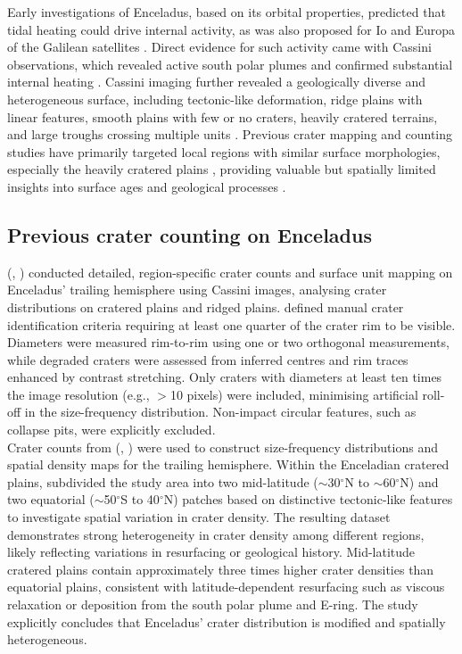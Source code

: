 \documentclass[preprint,11pt,3p,times,authoryear]{elsarticle}
\begin{document}
Early investigations of Enceladus, based on its orbital properties, predicted that tidal heating could drive internal activity, as was also proposed for Io and Europa of the Galilean satellites \citep{Cassen1979, Peale1979}. Direct evidence for such activity came with Cassini observations, which revealed active south polar plumes and confirmed substantial internal heating \citep{Porco2006, Spencer2006}. Cassini imaging further revealed a geologically diverse and heterogeneous surface, including tectonic-like deformation, ridge plains with linear features, smooth plains with few or no craters, heavily cratered terrains, and large troughs crossing multiple units \citep{Helfenstein2010}. Previous crater mapping and counting studies have primarily targeted local regions with similar surface morphologies, especially the heavily cratered plains \citep{Kirchoff2009, Kinczyk2024, Blanco-Rojas2024}, providing valuable but spatially limited insights into surface ages and geological processes \citep{Kirchoff2010, Bland2012, Martin2017}.

\subsection{Previous crater counting on Enceladus}
\citeauthor{Kirchoff2009} (\citeyear{Kirchoff2009}, \citeyear{Kirchoff2010}) conducted detailed, region-specific crater counts and surface unit mapping on Enceladus’ trailing hemisphere using Cassini images, analysing crater distributions on cratered plains and ridged plains. \citet{Kirchoff2009} defined manual crater identification criteria requiring at least one quarter of the crater rim to be visible. Diameters were measured rim-to-rim using one or two orthogonal measurements, while degraded craters were assessed from inferred centres and rim traces enhanced by contrast stretching. Only craters with diameters at least ten times the image resolution (e.g., $>$10 pixels) were included, minimising artificial roll-off in the size-frequency distribution. Non-impact circular features, such as collapse pits, were explicitly excluded.\\

Crater counts from \citeauthor{Kirchoff2009} (\citeyear{Kirchoff2009}, \citeyear{Kirchoff2010}) were used to construct size-frequency distributions and spatial density maps for the trailing hemisphere. Within the Enceladian cratered plains, \citet{Kirchoff2009} subdivided the study area into two mid-latitude ($\sim$30$^{\circ}$N to $\sim$60$^{\circ}$N) and two equatorial ($\sim$50$^{\circ}$S to 40$^{\circ}$N) patches based on distinctive tectonic-like features to investigate spatial variation in crater density. The resulting dataset demonstrates strong heterogeneity in crater density among different regions, likely reflecting variations in resurfacing or geological history. Mid-latitude cratered plains contain approximately three times higher crater densities than equatorial plains, consistent with latitude-dependent resurfacing such as viscous relaxation or deposition from the south polar plume and E-ring. The study explicitly concludes that Enceladus’ crater distribution is modified and spatially heterogeneous. \\
\end{document}
